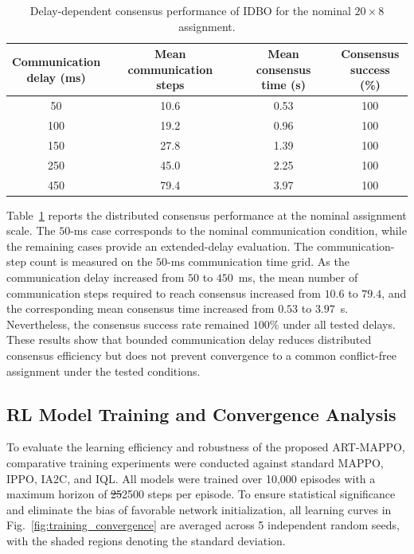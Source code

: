 \documentclass[lettersize,journal]{IEEEtran}
\newcommand{\hladd}[1]{{\color{blue}#1}}
\newcommand{\hldel}[1]{{\color{red}\sout{#1}}}
\begin{document}
\begin{table}[!t]
\centering
\footnotesize
\setlength{\tabcolsep}{2.8pt}
\renewcommand{\arraystretch}{1.12}
\caption{\hladd{Delay-dependent consensus performance of IDBO for the
nominal $20\times8$ assignment.}}
\label{tab:idbo_delay_scalability}
\hladd{\begin{tabular}{@{}cccc@{}}
\hline\hline
\shortstack{Communication\\delay (ms)} &
\shortstack{Mean communication\\steps} &
\shortstack{Mean consensus\\time (s)} &
\shortstack{Consensus\\success (\%)} \\
\hline
50  & 10.6 & 0.53 & 100 \\
100 & 19.2 & 0.96 & 100 \\
150 & 27.8 & 1.39 & 100 \\
250 & 45.0 & 2.25 & 100 \\
450 & 79.4 & 3.97 & 100 \\
\hline
\end{tabular}}
\end{table}

\hladd{Table~\ref{tab:idbo_delay_scalability} reports the distributed
consensus performance at the nominal assignment scale. The $50$-ms case
corresponds to the nominal communication condition, while the remaining cases
provide an extended-delay evaluation. The communication-step count is measured
on the $50$-ms communication time grid. As the communication delay increased
from $50$ to $450$~ms, the mean number of communication steps required to
reach consensus increased from
$10.6$ to $79.4$, and the corresponding mean consensus time increased from
$0.53$ to $3.97$~s. Nevertheless, the consensus success rate remained
$100\%$ under all tested delays. These results show that bounded communication
delay reduces distributed consensus efficiency but does not prevent convergence
to a common conflict-free assignment under the tested conditions.}








\subsection{RL Model Training and Convergence Analysis}
\label{subsec:training}

To evaluate the learning efficiency and robustness of the proposed ART-MAPPO, comparative training experiments were conducted against standard MAPPO, IPPO, IA2C, and IQL. All models were trained over 10,000 episodes with a maximum horizon of \hldel{25}\hladd{2500} steps per episode. To ensure statistical significance and eliminate the bias of favorable network initialization, all learning curves in Fig.~\ref{fig:training_convergence} are averaged across 5 independent random seeds, with the shaded regions denoting the standard deviation.
\end{document}
